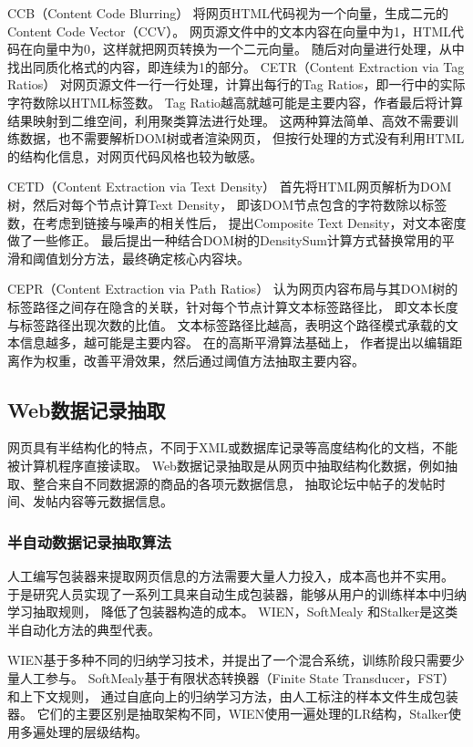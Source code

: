 CCB（Content Code Blurring）
将网页HTML代码视为一个向量，生成二元的Content Code Vector（CCV）。
网页源文件中的文本内容在向量中为1，HTML代码在向量中为0，这样就把网页转换为一个二元向量。
随后对向量进行处理，从中找出同质化格式的内容，即连续为1的部分。
CETR（Content Extraction via Tag Ratios）
对网页源文件一行一行处理，计算出每行的Tag Ratios，即一行中的实际字符数除以HTML标签数。
Tag Ratio越高就越可能是主要内容，作者最后将计算结果映射到二维空间，利用聚类算法进行处理。
这两种算法简单、高效不需要训练数据，也不需要解析DOM树或者渲染网页，
但按行处理的方式没有利用HTML的结构化信息，对网页代码风格也较为敏感。

CETD（Content Extraction via Text Density）
首先将HTML网页解析为DOM树，然后对每个节点计算Text Density，
即该DOM节点包含的字符数除以标签数，在考虑到链接与噪声的相关性后，
提出Composite Text Density，对文本密度做了一些修正。
最后提出一种结合DOM树的DensitySum计算方式替换常用的平滑和阈值划分方法，最终确定核心内容块。

CEPR（Content Extraction via Path Ratios）
认为网页内容布局与其DOM树的标签路径之间存在隐含的关联，针对每个节点计算文本标签路径比，
即文本长度与标签路径出现次数的比值。
文本标签路径比越高，表明这个路径模式承载的文本信息越多，越可能是主要内容。
在\cite{weninger2010cetr}的高斯平滑算法基础上，
作者提出以编辑距离作为权重，改善平滑效果，然后通过阈值方法抽取主要内容。

\subsection{Web数据记录抽取}
网页具有半结构化的特点，不同于XML或数据库记录等高度结构化的文档，不能被计算机程序直接读取。
Web数据记录抽取是从网页中抽取结构化数据，例如抽取、整合来自不同数据源的商品的各项元数据信息，
抽取论坛中帖子的发帖时间、发帖内容等元数据信息。

\subsubsection{半自动数据记录抽取算法}

人工编写包装器来提取网页信息的方法需要大量人力投入，成本高也并不实用。
于是研究人员实现了一系列工具来自动生成包装器，能够从用户的训练样本中归纳学习抽取规则，
降低了包装器构造的成本。
WIEN，SoftMealy
和Stalker是这类半自动化方法的典型代表。

WIEN基于多种不同的归纳学习技术，并提出了一个混合系统，训练阶段只需要少量人工参与。
SoftMealy基于有限状态转换器（Finite State Transducer，FST）和上下文规则，
通过自底向上的归纳学习方法，由人工标注的样本文件生成包装器。
它们的主要区别是抽取架构不同，WIEN使用一遍处理的LR结构，Stalker使用多遍处理的层级结构。

